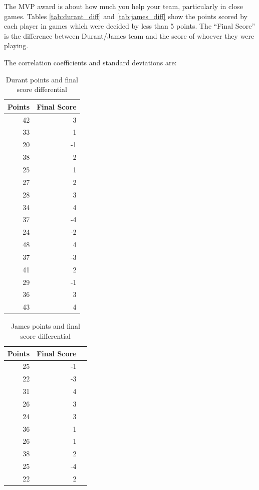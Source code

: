 \documentclass[letterpaper]{exam}
\begin{document}
\begin{questions}
    \question
      The MVP award is about how much you help your team, particularly in close
      games.  Tables \ref{tab:durant_diff} and \ref{tab:james_diff} show the points
      scored by each player in games which were decided by less than 5 points.  The
      ``Final Score'' is the difference between Durant/James team and the score of
      whoever they were playing.

      The correlation coefficients and standard deviations are:

      \begin{table}[ht]
        \centering
        \begin{tabular}{rr}
          \toprule
          Points & Final Score \\
          \midrule
          42     & 3 \\
          33     & 1 \\
          20     & -1 \\
          38     & 2 \\
          25     & 1 \\
          27     & 2 \\
          28     & 3 \\
          34     & 4 \\
          37     & -4 \\
          24     & -2 \\
          48     & 4 \\
          37     & -3 \\
          41     & 2 \\
          29     & -1 \\
          36     & 3 \\
          43     & 4 \\
          \bottomrule
        \end{tabular}
        \caption{Durant points and final score differential}
        \label{tab:durant_pt_diff}
      \end{table}

      \begin{table}[ht]
        \centering
        \begin{tabular}{rrr}
          \toprule
          Points & Final Score \\
          \midrule
          25     & -1 \\
          22     & -3 \\
          31     & 4 \\
          26     & 3 \\
          24     & 3 \\
          36     & 1 \\
          26     & 1 \\
          38     & 2 \\
          25     & -4 \\
          22     & 2 \\
          \bottomrule
        \end{tabular}
        \caption{James points and final score differential}
        \label{tab:james_pt_diff}
      \end{table}


\end{questions}
\end{document}
